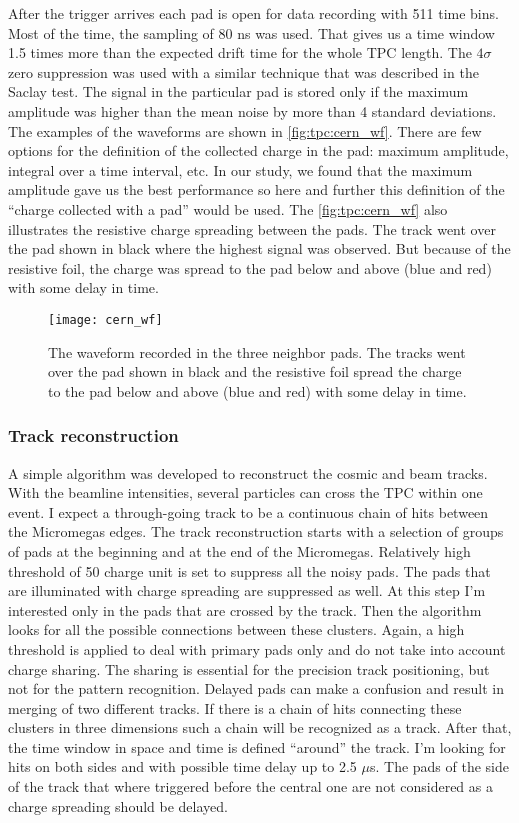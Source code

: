 \documentclass[../main.tex]{subfiles}
\begin{document}
After the trigger arrives each pad is open for data recording with 511 time bins. Most of the time, the sampling of 80 ns was used. That gives us a time window 1.5 times more than the expected drift time for the whole TPC length. The $4\sigma$ zero suppression was used with a similar technique that was described in the Saclay test. The signal in the particular pad is stored only if the maximum amplitude was higher than the mean noise by more than 4 standard deviations. The examples of the waveforms are shown in \autoref{fig:tpc:cern_wf}. There are few options for the definition of the collected charge in the pad: maximum amplitude, integral over a time interval, etc. In our study, we found that the maximum amplitude gave us the best performance so here and further this definition of the ``charge collected with a pad'' would be used. The \autoref{fig:tpc:cern_wf} also illustrates the resistive charge spreading between the pads. The track went over the pad shown in black where the highest signal was observed. But because of the resistive foil, the charge was spread to the pad below and above (blue and red) with some delay in time.

\begin{figure}[!ht]
   \centering
   \texttt{[image: cern\_wf]}
   \caption{The waveform recorded in the three neighbor pads. The tracks went over the pad shown in black and the resistive foil spread the charge to the pad below and above (blue and red) with some delay in time.}
   \label{fig:tpc:cern_wf}
 \end{figure}

\subsubsection{Track reconstruction}
A simple algorithm was developed to reconstruct the cosmic and beam tracks. With the beamline intensities, several particles can cross the TPC within one event. I expect a through-going track to be a continuous chain of hits between the Micromegas edges. The track reconstruction starts with a selection of groups of pads at the beginning and at the end of the Micromegas. Relatively high threshold of 50 charge unit is set to suppress all the noisy pads. The pads that are illuminated with charge spreading are suppressed as well. At this step I'm interested only in the pads that are crossed by the track. Then the algorithm looks for all the possible connections between these clusters. Again, a high threshold is applied to deal with primary pads only and do not take into account charge sharing. The sharing is essential for the precision track positioning, but not for the pattern recognition. Delayed pads can make a confusion and result in merging of two different tracks. If there is a chain of hits connecting these clusters in three dimensions such a chain will be recognized as a track. After that, the time window in space and time is defined ``around'' the track. I'm looking for hits on both sides and with possible time delay up to 2.5 $\mu$s. The pads of the side of the track that where triggered before the central one are not considered as a charge spreading should be delayed. 
\end{document}

